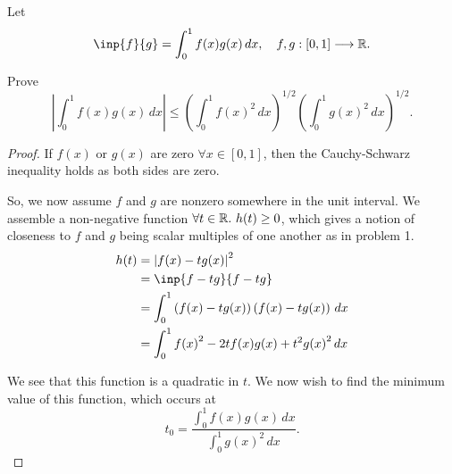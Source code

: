 \documentclass[..hw1]{subfiles}
\begin{document}
\begin{problem}
Let \[
	\inp{f }{g }=\int_{0}^{1} f(x)g(x)\, dx,\quad f,g:[0,1]\longrightarrow\R
	.\]

Prove \[
	\left| \int_{0}^{1} f(x)g(x)\,dx \right| \le {\left( \int_{0}^{1} {f(x)}^2\,dx  \right) }^{1 / 2}{\left( \int_{0}^{1} {g(x)}^2\,dx  \right) }^{1/2}
	.\]
\end{problem}
\begin{proof}
	If $f(x)$ or $g(x)$ are zero $\forall x\in [0,1]$, then the Cauchy-Schwarz inequality holds as both sides are zero.

	So, we now assume $f$ and  $g$ are nonzero somewhere in the unit interval. We assemble a non-negative function  $\forall t\in \mathbb{R}.\ h(t)\ge 0$, which gives a notion of closeness to $f$ and $g$ being scalar multiples of one another as in problem 1.
	\begin{align*}
		h(t) & = {|f(x)-tg(x)|}^2                                                    \\
		     & = \inp{f-tg}{f-tg}                                                    \\
		     & = \int_{0}^{1} \left( f(x)-tg(x) \right)\left( f(x)-tg(x) \right)\,dx \\
		     & = \int_{0}^{1} {f(x)}^2-2tf(x)g(x)+t^2{g(x)}^2\,dx                    \\
	\end{align*}

	We see that this function is a quadratic in $t$. We now wish to find the minimum value of this function, which occurs at  \[
		t_0=\frac{\int_{0}^{1} f(x)g(x)\,dx }{\int_{0}^{1} {g(x)}^2\,dx }
		.\]


\end{proof}
\end{document}

